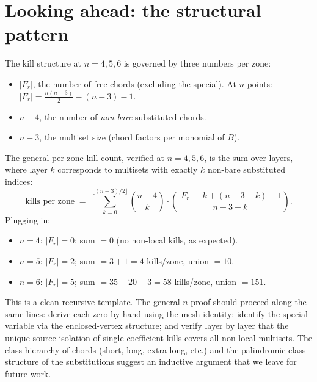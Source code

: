\documentclass[11pt]{article}
\newcommand{\Fr}{F}
\begin{document}
\section{Looking ahead: the structural pattern}

The kill structure at $n = 4, 5, 6$ is governed by three numbers per
zone:
\begin{itemize}\setlength\itemsep{0pt}
  \item $|\Fr_r|$, the number of free chords (excluding the special).
  At $n$ points: $\displaystyle |\Fr_r| = \frac{n(n-3)}{2} - (n-3) - 1$.
  \item $n - 4$, the number of \emph{non-bare} substituted chords.
  \item $n - 3$, the multiset size (chord factors per monomial of $B$).
\end{itemize}

The general per-zone kill count, verified at $n = 4, 5, 6$, is the sum
over layers, where layer $k$ corresponds to multisets with exactly $k$
non-bare substituted indices:
\begin{equation}\label{eq:kills}
\text{kills per zone}
\;=\; \sum_{k=0}^{\lfloor (n-3)/2 \rfloor}
\binom{n-4}{k}\cdot
\binom{|\Fr_r| - k + (n-3-k) - 1}{n - 3 - k}.
\end{equation}
Plugging in:
\begin{itemize}\setlength\itemsep{0pt}
  \item $n = 4$: $|\Fr_r| = 0$; sum $= 0$ (no non-local kills, as expected).
  \item $n = 5$: $|\Fr_r| = 2$; sum $= 3 + 1 = 4$ kills/zone, union $= 10$.
  \item $n = 6$: $|\Fr_r| = 5$; sum $= 35 + 20 + 3 = 58$ kills/zone, union $= 151$.
\end{itemize}

This is a clean recursive template. The general-$n$ proof should
proceed along the same lines: derive each zero by hand using the mesh
identity; identify the special variable via the enclosed-vertex
structure; and verify layer by layer that the unique-source isolation
of single-coefficient kills covers all non-local multisets. The class
hierarchy of chords (short, long, extra-long, etc.) and the palindromic
class structure of the substitutions suggest an inductive argument that
we leave for future work.
\end{document}

